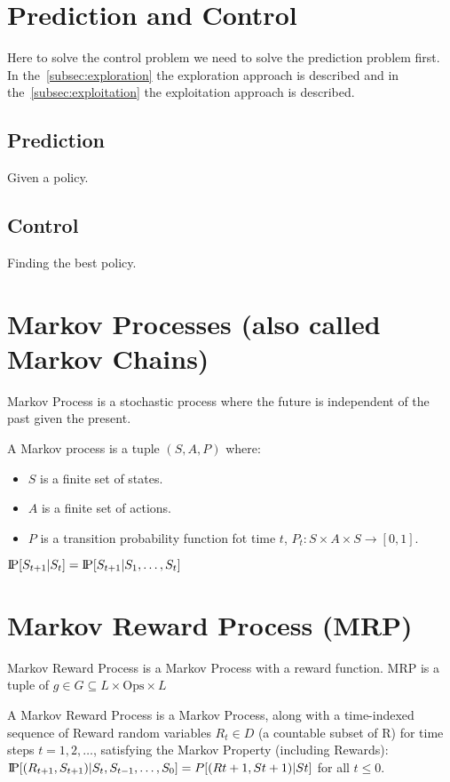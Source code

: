 \section{Prediction and Control}\label{sec:prediction-vs.-control}
Here to solve the control problem we need to solve the prediction problem first.
In the~\ref{subsec:exploration} the exploration approach is described and
in the~\ref{subsec:exploitation} the exploitation approach is described.

\subsection{Prediction}\label{subsec:prediction}
Given a policy.

\subsection{Control}\label{subsec:control}
Finding the best policy.


\section{Markov Processes (also called Markov Chains)}\label{sec:markov-processes}
Markov Process is a stochastic process where the future is independent of the past given the present.

\begin{definition}
    A Markov process is a tuple $(S,A,P)$ where:
    \begin{itemize}
        \item $S$ is a finite set of states.
        \item $A$ is a finite set of actions.
        \item $P$ is a transition probability function fot time $t$, $P_t:S\times A\times S\to[0,1]$.
    \end{itemize}
\end{definition}
$\text{I\kern-0.15em P}[S_{t+1}|S_t] = \text{I\kern-0.15em P}[S_{t+1}|S_1,\ldots,S_t]$


\section{Markov Reward Process (MRP)}\label{sec:markov-reward-process}
Markov Reward Process is a Markov Process with a reward function.
MRP is a tuple of $g\in G\subseteq L \times \mathrm{Ops} \times L$
\begin{definition}
    A Markov Reward Process is a Markov Process, along with a time-indexed
    sequence of Reward random variables $R_t \in D$ (a countable subset of R) for time steps $t =
    1,2,\ldots$, satisfying the Markov Property (including Rewards):
    $\text{I\kern-0.15em P}[(R_{t+1}, S_{t+1})|S_t, S_{t-1}, \ldots, S_0] = P[(Rt+1, St+1)|St]$ for all $t \leq 0.$~\cite[p.~79]{rao-2022}
\end{definition}

